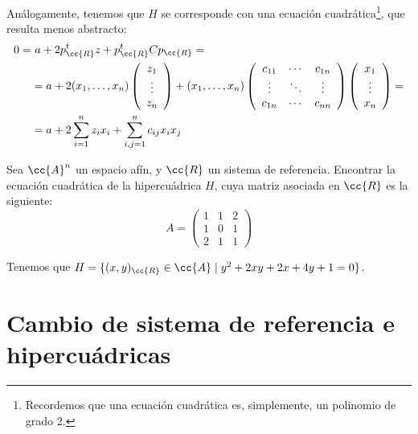 Análogamente, tenemos que $H$ se corresponde con una ecuación cuadrática\footnote{Recordemos que una ecuación cuadrática es, simplemente, un polinomio de grado 2.}, que resulta menos abstracto:
\begin{equation*}\begin{split}
    0 =&~a + 2p_{\cc{R}}^tz + p_{\cc{R}}^tCp_{\cc{R}} =\\&=a + 2(x_1,\dots,x_n)\left(\begin{array}{c}
        z_1 \\ \vdots \\ z_n
    \end{array}\right)
    + (x_1,\dots,x_n)
    \left(\begin{array}{ccc}
        c_{11} & \cdots & c_{1n} \\
        \vdots& \ddots & \vdots \\
        c_{1n}& \cdots & c_{nn}
    \end{array}\right)
    \left(\begin{array}{c}
        x_1 \\ \vdots \\ x_n
    \end{array}\right)
    =\\&= a + 2\sum_{i=1}^nz_ix_i + \sum_{i,j=1}^n c_{ij}x_ix_j 
\end{split}\end{equation*}

\begin{ejemplo}
    Sea $\cc{A}^n$ un espacio afín, y $\cc{R}$ un sistema de referencia. Encontrar la ecuación cuadrática de la hipercuádrica $H$, cuya matriz asociada en $\cc{R}$ es la siguiente:
    \begin{equation*}
        A = \left(\begin{array}{c|cc}
            1 & 1 & 2 \\ \hline
            1 & 0 & 1 \\
            2 & 1 & 1
        \end{array}\right)
    \end{equation*}

    Tenemos que $H=\{(x,y)_\cc{R}\in \cc{A} \mid y^2 + 2xy + 2x+4y+1=0\}$.
\end{ejemplo}

\section{Cambio de sistema de referencia e hipercuádricas}

